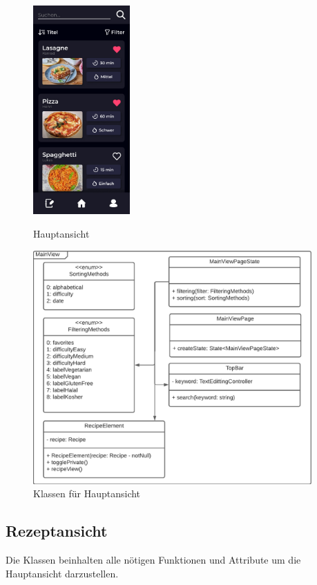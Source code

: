 \documentclass[parskip=full]{scrartcl}
\begin{document}
    \begin{figure}[htp]
        \begin{minipage}
            [t]{0.49\textwidth}
            \centering
            \includegraphics[height=80mm]{images/Presentation-layer/MainView.jpg}
            \caption{Hauptansicht}
        \end{minipage}
        \begin{minipage}
            [t]{0.49\textwidth}
            \centering
            \includegraphics[width=0.95\textwidth]{images/Presentation-layer/MainViewClass.pdf}
            \caption{Klassen für Hauptansicht}
        \end{minipage}
    \end{figure}

\subsection{Rezeptansicht}
    Die Klassen beinhalten alle nötigen Funktionen und Attribute um die Hauptansicht darzustellen.
\end{document}
